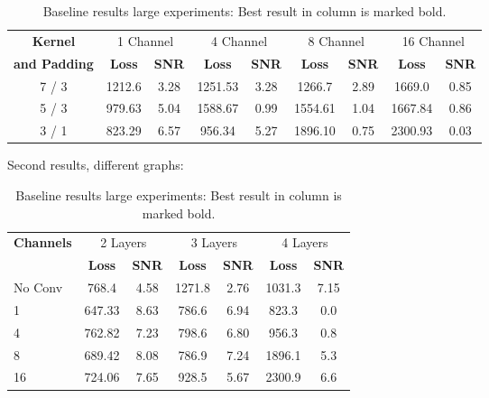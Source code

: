 \begin{table}[H]
  \centering
  \begin{tabular}{c|cc|cc|cc|cc}
    \toprule
    \textbf{Kernel}  & \multicolumn{2}{c|}{1 Channel} & \multicolumn{2}{c|}{4 Channel} & \multicolumn{2}{c|}{8 Channel} & \multicolumn{2}{c}{16 Channel} \\
    \textbf{and Padding}  & \textbf{Loss} & \textbf{SNR} & \textbf{Loss} & \textbf{SNR} & \textbf{Loss} & \textbf{SNR} & \textbf{Loss} & \textbf{SNR} \\ 
    \midrule
      7 / 3 & 1212.6 & 3.28 & 1251.53  &  3.28 &1266.7  & 2.89 & 1669.0  & 0.85 \\ \hline
      5 / 3 & 979.63 & 5.04 & 1588.67  &  0.99 &1554.61 & 1.04 & 1667.84 & 0.86 \\ \hline
      3 / 1 & 823.29 & 6.57 & 956.34   &  5.27 &1896.10 & 0.75 & 2300.93 & 0.03 \\

    \midrule
  \end{tabular}

  \caption{Baseline results large experiments: Best result in column is marked bold. }
  \label{tab:baseline-large}
\end{table}


Second results, different graphs:

\begin{table}[H]
  \centering
  \begin{tabular}{l|cc|cc|cc}
    \toprule
    \textbf{Channels } & \multicolumn{2}{c|}{2 Layers} & \multicolumn{2}{c|}{3 Layers} & \multicolumn{2}{c}{4 Layers}  \\
                       & \textbf{Loss} & \textbf{SNR} & \textbf{Loss} & \textbf{SNR} & \textbf{Loss} & \textbf{SNR} \\ 
    \midrule
		No Conv & 768.4  & 4.58 & 1271.8 & 2.76 & 1031.3 & 7.15 \\ \hline
		1       & 647.33 & 8.63 & 786.6  & 6.94 & 823.3  & 0.0 \\ \hline
		4       & 762.82 & 7.23 & 798.6  & 6.80 & 956.3  & 0.8 \\ \hline
		8       & 689.42 & 8.08 & 786.9  & 7.24 & 1896.1 & 5.3 \\ \hline
		16      & 724.06 & 7.65 & 928.5  & 5.67 & 2300.9 & 6.6 \\

    \midrule
  \end{tabular}

  \caption{Baseline results large experiments: Best result in column is marked bold. }
  \label{tab:baseline-large}
\end{table}



